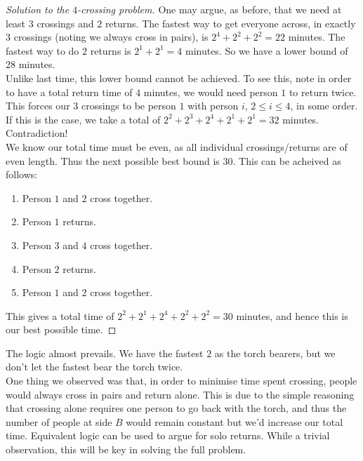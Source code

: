 \documentclass{article}
\begin{document}
\begin{proof}[Solution to the $4$-crossing problem]
    One may argue, as before, that we need at least $3$ crossings and $2$ returns. The fastest way to get everyone 
    across, in exactly $3$ crossings (noting we always cross in pairs), is $2^4 + 2^2 + 2^2 = 22$ minutes. The fastest way to do $2$ returns 
    is $2^1 + 2^1 = 4$ minutes. So we have a lower bound of $28$ minutes. \\
    
    Unlike last time, this lower bound cannot be achieved. To see this, note in order to have a total return time of 
    $4$ minutes, we would need person $1$ to return twice. This forces our $3$ crossings to be person $1$ with 
    person $i$, $2 \leq i \leq 4$, in some order. If this is the case, we take a total of $2^2 + 2^3 + 2^4 + 2^1 
    + 2^1 = 32$ minutes. Contradiction! \\

    We know our total time must be even, as all individual crossings/returns are of even length. Thus the next 
    possible best bound is $30$. This can be acheived as follows: 
    \begin{enumerate}
        \item Person $1$ and $2$ cross together.
        \item Person $1$ returns. 
        \item Person $3$ and $4$ cross together. 
        \item Person $2$ returns.
        \item Person $1$ and $2$ cross together.
    \end{enumerate}
    This gives a total time of $2^2 + 2^1 + 2^4 + 2^2 + 2^2 = 30$ minutes, and hence this is our best possible time.
\end{proof}

The logic almost prevails. We have the fastest $2$ as the torch bearers, but we don't let the fastest bear the torch 
twice. \\

One thing we observed was that, in order to minimise time spent crossing, people would always cross in pairs and return alone. This is due to 
the simple reasoning that crossing alone requires one person to go back with the torch, and thus the number of people at side $B$ would remain 
constant but we'd increase our total time. Equivalent logic can be used to argue for solo returns. While a trivial observation, this will be key 
in solving the full problem. \\ 
\end{document}
